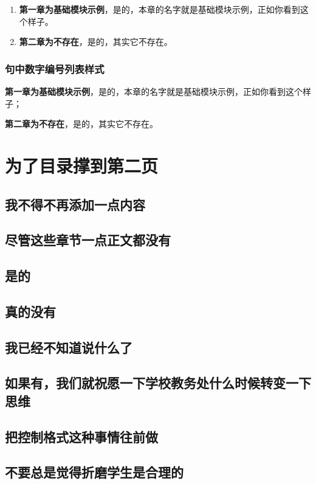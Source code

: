 \documentclass[a4paper,AutoFakeBold,oneside,12pt]{book}
\begin{document}
\begin{enumerate}
\item \textbf{第一章为基础模块示例}，是的，本章的名字就是基础模块示例，正如你看到这个样子。
\item \textbf{第二章为不存在}，是的，其实它不存在。
\end{enumerate}

\subsection{句中数字编号列表样式}

\begin{enumerate*}
    \item \textbf{第一章为基础模块示例}，是的，本章的名字就是基础模块示例，正如你看到这个样子；
    \item \textbf{第二章为不存在}，是的，其实它不存在。
\end{enumerate*}

\chapter{为了目录撑到第二页}
\section{我不得不再添加一点内容}
\section{尽管这些章节一点正文都没有}
\section{是的}
\section{真的没有}
\section{我已经不知道说什么了}
\section{如果有，我们就祝愿一下学校教务处什么时候转变一下思维}
\section{把控制格式这种事情往前做}
\section{不要总是觉得折磨学生是合理的}
\end{document}
